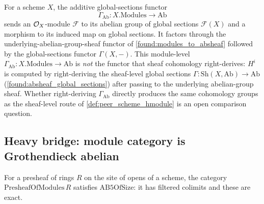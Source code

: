 \begin{definition}
  \leanok
  \label{found:global_sections_ab}
  For a scheme \(X\), the additive global-sections functor
  \[
    \Gamma_{\mathrm{Ab}}:X.\mathrm{Modules}\to\mathrm{Ab}
  \]
  sends an \(\mathcal{O}_X\)-module \(\mathcal F\) to its abelian group of global
  sections \(\mathcal F(X)\) and a morphism to its induced map on global
  sections.  It factors through the underlying-abelian-group-sheaf functor of
  \cref{found:modules_to_absheaf} followed by the global-sections functor
  \(\Gamma(X,-)\).  This module-level \(\Gamma_{\mathrm{Ab}}:X.\mathrm{Modules}\to
  \mathrm{Ab}\) is \emph{not} the functor that sheaf cohomology right-derives:
  \(H^i\) is computed by right-deriving the sheaf-level global sections
  \(\Gamma:\mathrm{Sh}(X,\mathrm{Ab})\to\mathrm{Ab}\)
  (\cref{found:absheaf_global_sections}) after passing to the underlying
  abelian-group sheaf.  Whether right-deriving \(\Gamma_{\mathrm{Ab}}\)
  directly produces the same cohomology groups as the sheaf-level route of
  \cref{def:peer_scheme_hmodule} is an open comparison question.
\end{definition}

\subsection{Heavy bridge: module category is Grothendieck abelian}

\begin{lemma}
  \label{found:presheafmod_ab5}
  For a presheaf of rings \(R\) on the site of opens of a scheme, the category
  \(\mathrm{PresheafOfModules}\,R\) satisfies \(\mathrm{AB5OfSize}\): it has
  filtered colimits and these are exact.
\end{lemma}

